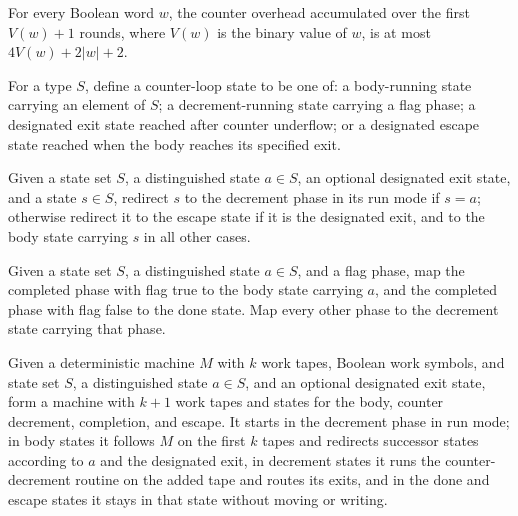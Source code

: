 \begin{theorem}
\label{Turing.counterOverhead_le}
\leanok
{}
For every Boolean word $w$, the counter overhead accumulated over the first $V(w)+1$
rounds, where $V(w)$ is the binary value of $w$, is at most $4V(w)+2|w|+2$.
\end{theorem}

\begin{definition}
\label{Turing.CounterLoopState}
\leanok
{}
For a type $S$, define a counter-loop state to be one of: a body-running state carrying
an element of $S$; a decrement-running state carrying a flag phase; a designated exit
state reached after counter underflow; or a designated escape state reached when the
body reaches its specified exit.
\end{definition}

\begin{definition}
\label{Turing.counterLoopRedirect}
\leanok
{}
Given a state set $S$, a distinguished state $a\in S$, an optional designated exit
state, and a state $s\in S$, redirect $s$ to the decrement phase in its run mode if
$s=a$; otherwise redirect it to the escape state if it is the designated exit, and to
the body state carrying $s$ in all other cases.
\end{definition}

\begin{definition}
\label{Turing.counterLoopDecExit}
\leanok
{}
Given a state set $S$, a distinguished state $a\in S$, and a flag phase, map the
completed phase with flag true to the body state carrying $a$, and the completed phase
with flag false to the done state. Map every other phase to the decrement state carrying
that phase.
\end{definition}

\begin{definition}
\label{Turing.counterLoopTM}
\leanok
{}
Given a deterministic machine $M$ with $k$ work tapes, Boolean work symbols, and state
set $S$, a distinguished state $a\in S$, and an optional designated exit state, form a
machine with $k+1$ work tapes and states for the body, counter decrement, completion,
and escape. It starts in the decrement phase in run mode; in body states it follows $M$
on the first $k$ tapes and redirects successor states according to $a$ and the
designated exit, in decrement states it runs the counter-decrement routine on the added
tape and routes its exits, and in the done and escape states it stays in that state
without moving or writing.
\end{definition}

